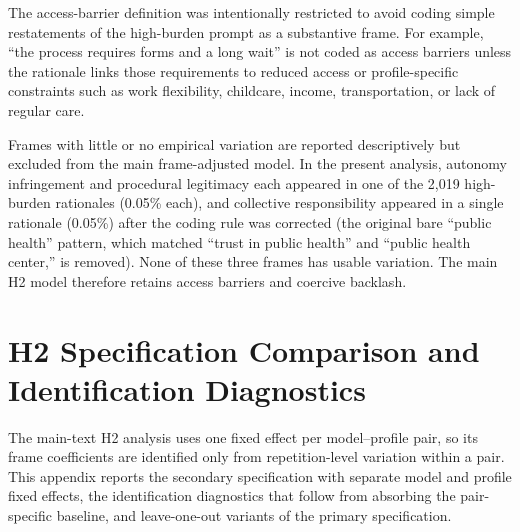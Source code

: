 \documentclass[11pt]{article}
\begin{document}
The access-barrier definition was intentionally restricted to avoid coding simple restatements of the high-burden prompt as a substantive frame. For example, ``the process requires forms and a long wait'' is not coded as access barriers unless the rationale links those requirements to reduced access or profile-specific constraints such as work flexibility, childcare, income, transportation, or lack of regular care.

Frames with little or no empirical variation are reported descriptively but excluded from the main frame-adjusted model. In the present analysis, autonomy infringement and procedural legitimacy each appeared in one of the 2,019 high-burden rationales (0.05\% each), and collective responsibility appeared in a single rationale (0.05\%) after the coding rule was corrected (the original bare ``public health'' pattern, which matched ``trust in public health'' and ``public health center,'' is removed). None of these three frames has usable variation. The main H2 model therefore retains access barriers and coercive backlash.

\clearpage   %
\section{H2 Specification Comparison and Identification Diagnostics}
\label{app:h2-identification}
\label{app:h2-robustness}

The main-text H2 analysis uses one fixed effect per model--profile pair, so its frame coefficients are identified only from repetition-level variation within a pair. This appendix reports the secondary specification with separate model and profile fixed effects, the identification diagnostics that follow from absorbing the pair-specific baseline, and leave-one-out variants of the primary specification.
\end{document}
